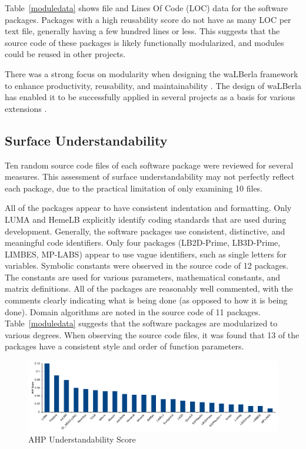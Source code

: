 \documentclass[final, 3p, times, authoryear]{elsarticle}
\begin{document}
Table~\ref{moduledata} shows file and Lines Of Code (LOC) data for the software
packages. Packages with a high reusability score do not have as many LOC per
text file, generally having a few hundred lines or less. This suggests that the
source code of these packages is likely functionally modularized, and modules
could be reused in other projects.

There was a strong focus on modularity when designing the waLBerla framework to
enhance productivity, reusability, and maintainability
\citep{bauer2021walberla}. The design of waLBerla has enabled it to be
successfully applied in several projects as a basis for various extensions
\citep{bauer2021walberla}.

\subsection{Surface Understandability}

Ten random source code files of each software package were reviewed for several
measures. This assessment of surface understandability may not perfectly reflect
each package, due to the practical limitation of only examining 10 files. 

All of the packages appear to have consistent indentation and formatting. Only
LUMA and HemeLB explicitly identify coding standards that are used during
development. Generally, the software packages use consistent, distinctive, and
meaningful code identifiers. Only four packages (LB2D-Prime, LB3D-Prime, LIMBES,
MP-LABS) appear to use vague identifiers, such as single letters for variables.
Symbolic constants were observed in the source code of 12 packages. The
constants are used for various parameters, mathematical constants, and matrix
definitions. All of the packages are reasonably well commented, with the
comments clearly indicating what is being done (as opposed to how it is being
done). Domain algorithms are noted in the source code of 11 packages.
Table~\ref{moduledata} suggests that the software packages are modularized to
various degrees. When observing the source code files, it was found that 13 of
the packages have a consistent style and order of function parameters.

\begin{figure}[h!]
	\begin{center}
		\includegraphics[width=1.0\textwidth]{./figures/understandability_chart.pdf}
		\caption{AHP Understandability Score}
		\label{Fig_Understandability}
	\end{center}
\end{figure}
\end{document}
